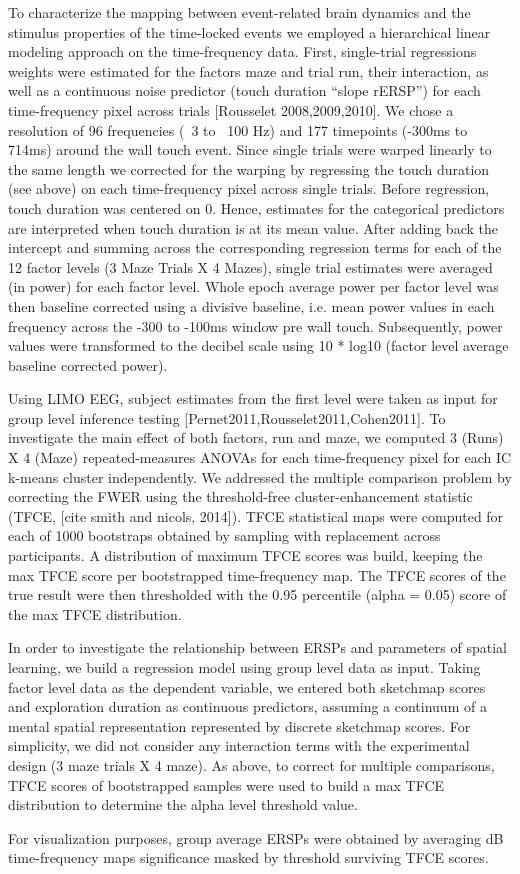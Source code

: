 To characterize the mapping between event-related brain dynamics and the stimulus properties of the time-locked events we employed a hierarchical linear modeling approach on the time-frequency data. First, single-trial regressions weights were estimated for the factors maze and trial run, their interaction, as well as a continuous noise predictor (touch duration “slope rERSP”) for each time-frequency pixel across trials [Rousselet 2008,2009,2010]. We chose a resolution of 96 frequencies  (~3 to ~100 Hz) and 177 timepoints (-300ms to 714ms) around the wall touch event. Since single trials were warped linearly to the same length we corrected for the warping by regressing the touch duration (see above) on each time-frequency pixel across single trials. Before regression, touch duration was centered on 0. Hence, estimates for the categorical predictors are interpreted when touch duration is at its mean value. After adding back the intercept and summing across the corresponding regression terms for each of the 12 factor levels (3 Maze Trials X 4 Mazes), single trial estimates were averaged (in power) for each factor level. Whole epoch average power per factor level was then baseline corrected using a divisive baseline, i.e. mean power values in each frequency across the -300 to -100ms window pre wall touch. Subsequently, power values were transformed to the decibel scale using 10 * log10 (factor level average baseline corrected power).

Using LIMO EEG, subject estimates from the first level were taken as input for group level inference testing [Pernet2011,Rousselet2011,Cohen2011]. To investigate the main effect of both factors, run and maze, we computed 3 (Runs) X 4 (Maze) repeated-measures ANOVAs for each time-frequency pixel for each IC k-means cluster independently. We addressed the multiple comparison problem by correcting the FWER using the threshold-free cluster-enhancement statistic (TFCE, [cite smith and nicols, 2014]). TFCE statistical maps were computed for each of 1000 bootstraps obtained by sampling with replacement across participants. A distribution of maximum TFCE scores was build, keeping the max TFCE score per bootstrapped time-frequency map. The TFCE scores of the true result were then thresholded with the 0.95 percentile (alpha = 0.05) score of the max TFCE distribution.

In order to investigate the relationship between ERSPs and parameters of spatial learning, we build a regression model using group level data as input. Taking factor level data as the dependent variable, we entered both sketchmap scores and exploration duration as continuous predictors, assuming a continuum of a mental spatial representation represented by discrete sketchmap scores. For simplicity, we did not consider any interaction terms with the experimental design (3 maze trials X 4 maze). As above, to correct for multiple comparisons, TFCE scores of bootstrapped samples were used to build a max TFCE distribution to determine the alpha level threshold value.

For visualization purposes, group average ERSPs were obtained by averaging dB time-frequency maps significance masked by threshold surviving TFCE scores.
